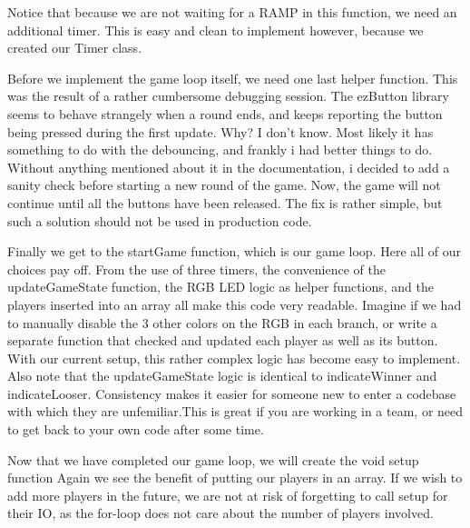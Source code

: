 \documentclass[journal]{IEEEtran}
\begin{document}

Notice that because we are not waiting for a RAMP in this function, we need an additional timer. This
is easy and clean to implement however, because we created our Timer class.


Before we implement the game loop itself, we need one last helper function. This was the result of a
rather cumbersome debugging session. The ezButton library seems to behave strangely when a round ends,
and keeps reporting the button being pressed during the first update. Why? I don't know. Most likely
it has something to do with the debouncing, and frankly i had better things to do.
Without anything mentioned about it in the documentation, i decided to add a sanity check
before starting a new round of the game. Now, the game will not continue until all the buttons have
been released. The fix is rather simple, but such a solution should not be used in production code.


Finally we get to the startGame function, which is our game loop.
Here all of our choices pay off. From the use of three timers, the convenience of the updateGameState function,
the RGB LED logic as helper functions, and the players inserted into an array all make this code very readable.
Imagine if we had to manually disable the 3 other colors on the RGB in each branch, or write a separate function
that checked and updated each player as well as its button. With our current setup, this rather complex logic
has become easy to implement. Also note that the updateGameState\(\) logic is identical to indicateWinner
and indicateLooser. Consistency makes it easier for someone new to enter a codebase with which they are
unfemiliar.This is great if you are working in a team, or need to get back to your own code after some time.


Now that we have completed our game loop, we will create the void setup\(\) function
Again we see the benefit of putting our players in an array. If we wish
to add more players in the future, we are not at risk of forgetting to
call setup for their IO, as the for-loop does not care about the number of
players involved.\\
\end{document}
